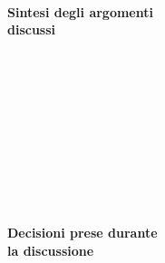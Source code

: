 \documentclass[10pt, a4paper]{article}
\title{\data}
\author{SWEetCode}
\begin{document}


\setlength{\parindent}{0mm}
\setlength{\columnsep}{2.2em}
\setlength{\columnseprule}{4pt}
\begin{paracol}{2}


\intestazione
\vspace{11.2em}

\partecipanti

\newpage

\switchcolumn
\revisioneAzioni
\vspace{24.1em}

\ordineGiorno

\newpage


\switchcolumn

\\
\textbf{Sintesi degli argomenti\\discussi}



 \newpage
 ~\\\\\\\\\\\\\\~

\\
\textbf{Decisioni prese durante\\la discussione}

\switchcolumn

\discussione

\vspace{4.5em}

\decisioni

\end{paracol}

\vspace{4.5em}

\end{document}
